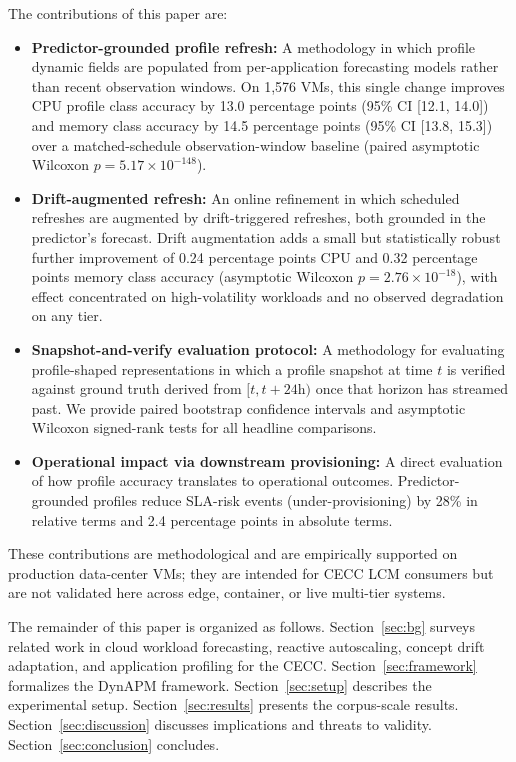 \documentclass[manuscript,screen,review,anonymous]{acmart}
\begin{document}
The contributions of this paper are:
\begin{itemize}
\item \textbf{Predictor-grounded profile refresh:} A methodology in which
profile dynamic fields are populated from per-application forecasting
models rather than recent observation windows. On 1{,}576 VMs, this
single change improves CPU profile class accuracy by 13.0 percentage
points (95\% CI [12.1, 14.0]) and memory class accuracy by 14.5
percentage points (95\% CI [13.8, 15.3]) over a matched-schedule
observation-window baseline (paired asymptotic Wilcoxon
$p = 5.17 \times 10^{-148}$).

\item \textbf{Drift-augmented refresh:} An online refinement in which
scheduled refreshes are augmented by drift-triggered refreshes, both
grounded in the predictor's forecast. Drift augmentation adds a small
but statistically robust further improvement of 0.24 percentage points
CPU and 0.32 percentage points memory class accuracy (asymptotic
Wilcoxon $p = 2.76 \times 10^{-18}$), with effect concentrated on
high-volatility workloads and no observed degradation on any tier.

\item \textbf{Snapshot-and-verify evaluation protocol:} A methodology
for evaluating profile-shaped representations in which a profile snapshot
at time $t$ is verified against ground truth derived from $[t, t+24\mathrm{h})$
once that horizon has streamed past. We provide paired bootstrap
confidence intervals and asymptotic Wilcoxon signed-rank tests for all
headline comparisons.

\item \textbf{Operational impact via downstream provisioning:} A direct
evaluation of how profile accuracy translates to operational outcomes.
Predictor-grounded profiles reduce SLA-risk events (under-provisioning)
by 28\% in relative terms and 2.4 percentage points in absolute terms.
\end{itemize}

These contributions are methodological and are empirically supported on
production data-center VMs; they are intended for CECC LCM consumers but
are not validated here across edge, container, or live multi-tier systems.



The remainder of this paper is organized as follows.
Section~\ref{sec:bg} surveys related work in cloud workload forecasting,
reactive autoscaling, concept drift adaptation, and application profiling
for the CECC. Section~\ref{sec:framework} formalizes the DynAPM
framework. Section~\ref{sec:setup} describes the experimental setup.
Section~\ref{sec:results} presents the corpus-scale results.
Section~\ref{sec:discussion} discusses implications and threats to
validity. Section~\ref{sec:conclusion} concludes.
\end{document}
